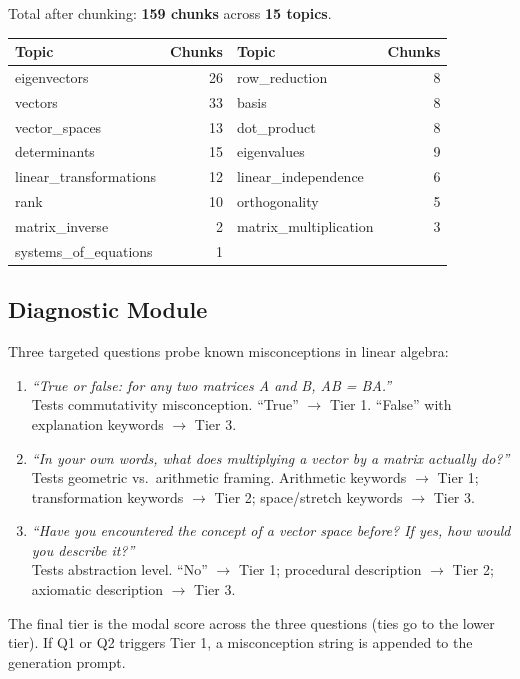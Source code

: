 \documentclass[11pt]{article}
\begin{document}
\medskip
Total after chunking: \textbf{159 chunks} across \textbf{15 topics}.

\medskip
\begin{tabular}{lrlr}
\toprule
Topic & Chunks & Topic & Chunks \\
\midrule
eigenvectors & 26 & row\_reduction & 8 \\
vectors & 33 & basis & 8 \\
vector\_spaces & 13 & dot\_product & 8 \\
determinants & 15 & eigenvalues & 9 \\
linear\_transformations & 12 & linear\_independence & 6 \\
rank & 10 & orthogonality & 5 \\
matrix\_inverse & 2 & matrix\_multiplication & 3 \\
systems\_of\_equations & 1 & & \\
\bottomrule
\end{tabular}

\subsection{Diagnostic Module}

Three targeted questions probe known misconceptions in linear algebra:

\begin{enumerate}
  \item \textit{``True or false: for any two matrices A and B, AB = BA.''} \\
  Tests commutativity misconception. ``True'' $\to$ Tier 1. ``False'' with explanation keywords $\to$ Tier 3.

  \item \textit{``In your own words, what does multiplying a vector by a matrix actually do?''} \\
  Tests geometric vs.\ arithmetic framing. Arithmetic keywords $\to$ Tier 1; transformation keywords $\to$ Tier 2; space/stretch keywords $\to$ Tier 3.

  \item \textit{``Have you encountered the concept of a vector space before? If yes, how would you describe it?''} \\
  Tests abstraction level. ``No'' $\to$ Tier 1; procedural description $\to$ Tier 2; axiomatic description $\to$ Tier 3.
\end{enumerate}

The final tier is the modal score across the three questions (ties go to the lower tier). If Q1 or Q2 triggers Tier 1, a misconception string is appended to the generation prompt.
\end{document}
